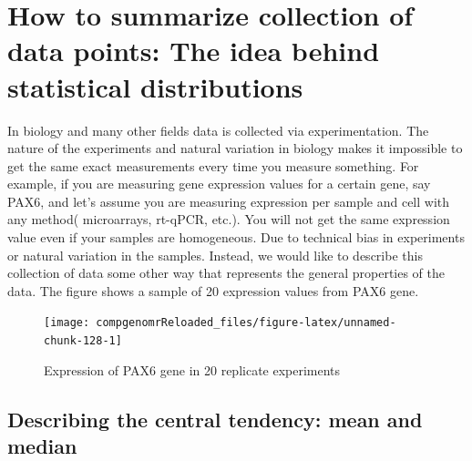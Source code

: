 \documentclass[12pt,]{krantz}
\begin{document}
\hypertarget{how-to-summarize-collection-of-data-points-the-idea-behind-statistical-distributions}{%
\section{How to summarize collection of data points: The idea behind statistical distributions}\label{how-to-summarize-collection-of-data-points-the-idea-behind-statistical-distributions}}

In biology and many other fields data is collected via experimentation.
The nature of the experiments and natural variation in biology makes
it impossible to get the same exact measurements every time you measure something.
For example, if you are measuring gene expression values for
a certain gene, say PAX6, and let's assume you are measuring expression
per sample and cell with any method( microarrays, rt-qPCR, etc.). You will not
get the same expression value even if your samples are homogeneous. Due
to technical bias in experiments or natural variation in the samples. Instead,
we would like to describe this collection of data some other way
that represents the general properties of the data. The figure shows a sample of
20 expression values from PAX6 gene.

\begin{figure}

{\centering \texttt{[image: compgenomrReloaded\_files/figure-latex/unnamed-chunk-128-1]} 

}

\caption{Expression of PAX6 gene in 20 replicate experiments}\label{fig:unnamed-chunk-128}
\end{figure}

\hypertarget{describing-the-central-tendency-mean-and-median}{%
\subsection{Describing the central tendency: mean and median}\label{describing-the-central-tendency-mean-and-median}}
\end{document}
